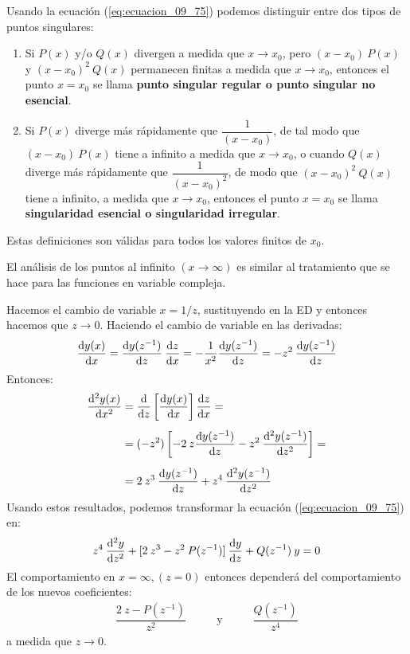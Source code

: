 \documentclass[12pt]{article}
\numberwithin{equation}{section}
\begin{document}
Usando la ecuación (\ref{eq:ecuacion_09_75}) podemos distinguir entre dos tipos de puntos singulares:
\begin{enumerate}
\item Si $P (x)$ y/o $Q (x)$ divergen a medida que $x \to x_{0}$, pero $(x - x_{0}) \: P (x)$ y $(x - x_{0})^{2} \: Q (x)$ permanecen finitas a medida que $x \to x_{0}$, entonces el punto $x = x_{0}$ se llama \textbf{punto singular regular o punto singular no esencial}.
\item Si $P (x)$ diverge más rápidamente que $\dfrac{1}{(x - x_{0})}$, de tal modo que $(x - x_{0}) \: P (x)$ tiene a infinito a medida que $x \to x_{0}$, o cuando $Q (x)$ diverge más rápidamente que $\dfrac{1}{(x - x_{0})^{2}}$, de modo que $(x - x_{0})^{2} \: Q (x)$ tiene a infinito, a medida que $x \to x_{0}$, entonces el punto $x = x_{0}$ se llama \textbf{singularidad esencial o singularidad irregular}.
\end{enumerate}
Estas definiciones son válidas para todos los valores finitos de $x_{0}$. 

El análisis de los puntos al infinito $(x \to \infty)$ es similar al tratamiento que se hace para las funciones en variable compleja.

Hacemos el cambio de variable $x = 1/z$, sustituyendo en la ED y entonces hacemos que $z \to 0$. Haciendo el cambio de variable en las derivadas:
\begin{align}
\dv{y(x)}{x} = \dv{y(z^{-1})}{z} \: \dv{z}{x} = - \dfrac{1}{x^{2}} \dv{y(z^{-1})}{z} = -z^{2} \: \dv{y(z^{-1})}{z}
\label{eq:ecuacion_09_76}
\end{align}
Entonces:
\begin{align}
\begin{aligned}
\dv[2]{y(x)}{x} &= \dv{z} \left[ \dv{y(x)}{x} \right] \dv{z}{x} = \\[0.5em]
&= (-z^{2}) \left[ -2 \: z \dv{y(z^{-1})}{z} - z^{2} \: \dv[2]{y(z^{-1})}{z} \right] = \\[0.5em]
&= 2 \: z^{3} \: \dv{y(z^{-1})}{z} + z^{4} \: \dv[2]{y(z^{-1})}{z}
\end{aligned}
\label{eq:ecuacion_09_77}
\end{align}
Usando estos resultados, podemos transformar la ecuación (\ref{eq:ecuacion_09_75}) en:
\begin{align}
z^{4} \: \dv[2]{y}{z} + [ 2 \: z^{3} - z^{2} \: P (z^{-1})] \: \dv{y}{z} + Q (z^{-1}) \: y = 0
\label{eq:ecuacion_09_78}
\end{align}
El comportamiento en $x = \infty, (z = 0)$ entonces dependerá del comportamiento de los nuevos coeficientes:
\begin{align*}
\dfrac{2 \: z - P (z^{-1})}{z^{2}} \hspace{1cm} \text{ y } \hspace{1cm} \dfrac{Q (z^{-1})}{z^{4}}
\end{align*}
a medida que $z \to 0$.
\end{document}

